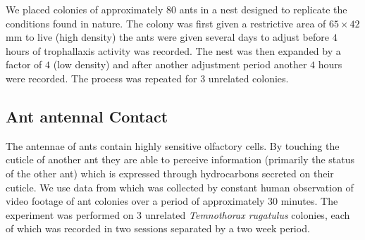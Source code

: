 \documentclass[10pt]{article}
\begin{document}
\begin{multicols}{2}
We placed colonies of approximately $80$ ants in a nest designed to replicate the conditions found in nature. The colony was first given a restrictive area of $65\times 42$mm to live (high density) the ants were given several days to adjust before $4$ hours of trophallaxis activity was recorded. The nest was then expanded by a factor of $4$ (low density) and after another adjustment period another $4$ hours were recorded. The process was repeated for $3$ unrelated colonies.

\subsection{Ant antennal Contact}
The antennae of ants contain highly sensitive olfactory cells. By touching the cuticle of another ant they are able to perceive information (primarily the status of the other ant) which is expressed through hydrocarbons secreted on their cuticle. We use data from \cite{10.1371/journal.pone.0020298} which was collected by constant human observation of video footage of ant colonies over a period of approximately 30 minutes. The experiment was performed on $3$ unrelated \emph{Temnothorax rugatulus} colonies, each of which was recorded in two sessions separated by a two week period.




\end{multicols}
\end{document}
